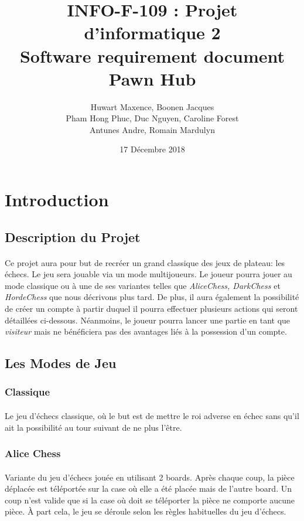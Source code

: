 \documentclass[10pt, a4paper]{article}
\title{\LARGE{INFO-F-109 : Projet d'informatique 2 }\\
       \textbf{Software requirement document\\
	   Pawn Hub}}
\author{Huwart Maxence, Boonen Jacques\\
		Pham Hong Phuc, Duc Nguyen, Caroline Forest\\
		Antunes Andre, Romain Mardulyn}
\date{17 Décembre 2018}
\begin{document}
	\maketitle
	\newpage
	\tableofcontents %
	\newpage
	\section{Introduction}
		\subsection{Description du Projet}
			\paragraph{}Ce projet aura pour but de recréer un grand classique des jeux de plateau: les échecs. Le jeu sera jouable via un mode multijoueurs. Le joueur pourra jouer au mode classique ou à une de ses variantes telles que  {\itshape AliceChess, DarkChess} et {\itshape HordeChess} que nous décrivons plus tard. De plus, il aura également la possibilité de créer un compte à partir duquel il pourra effectuer plusieurs actions qui seront détaillées ci-dessous. Néanmoins, le joueur pourra lancer une partie en tant que {\itshape visiteur} mais ne bénéficiera pas des avantages liés à la possession d'un compte.
			\subsection{Les Modes de Jeu}
				\subsubsection{Classique}
					\paragraph{}Le jeu d'échecs classique, où le but est de mettre le roi adverse en échec sans qu'il ait la possibilité au tour suivant de ne plus l'être.
				\subsubsection{Alice Chess}
					\paragraph{}Variante du jeu d'échecs jouée en utilisant 2 boards. Après chaque coup, la pièce déplacée est téléportée sur la case où elle a été placée mais de l'autre board. Un coup n'est valide que si la case où doit se téléporter la pièce ne comporte aucune pièce. À part cela, le jeu se déroule selon les règles habituelles du jeu d'échecs.
\end{document}
